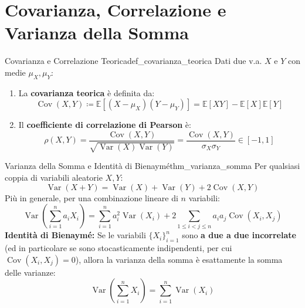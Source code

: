 \section{Covarianza, Correlazione e Varianza della Somma}
\label{sec:covarianza_teorica}

\begin{definizione}{Covarianza e Correlazione Teorica}{def_covarianza_teorica}
Dati due v.a. $X$ e $Y$ con medie $\mu_X, \mu_Y$:
\begin{enumerate}
    \item La \textbf{covarianza teorica} è definita da:
    \begin{equation}
        \operatorname{Cov}(X, Y) \coloneqq \mathbb{E}[(X - \mu_X)(Y - \mu_Y)] = \mathbb{E}[XY] - \mathbb{E}[X]\mathbb{E}[Y]
    \end{equation}
    \item Il \textbf{coefficiente di correlazione di Pearson} è:
    \begin{equation}
        \rho(X, Y) = \frac{\operatorname{Cov}(X, Y)}{\sqrt{\operatorname{Var}(X)\operatorname{Var}(Y)}} = \frac{\operatorname{Cov}(X, Y)}{\sigma_X \sigma_Y} \in [-1, 1]
    \end{equation}
\end{enumerate}
\end{definizione}

\begin{teorema}{Varianza della Somma e Identità di Bienaymé}{thm_varianza_somma}
Per qualsiasi coppia di variabili aleatorie $X, Y$:
\begin{equation}
    \operatorname{Var}(X + Y) = \operatorname{Var}(X) + \operatorname{Var}(Y) + 2\operatorname{Cov}(X, Y)
\end{equation}
Più in generale, per una combinazione lineare di $n$ variabili:
\begin{equation}
    \operatorname{Var}\left(\sum_{i=1}^n a_i X_i\right) = \sum_{i=1}^n a_i^2 \operatorname{Var}(X_i) + 2 \sum_{1 \le i < j \le n} a_i a_j \operatorname{Cov}(X_i, X_j)
\end{equation}
\textbf{Identità di Bienaymé:} Se le variabili $\{X_i\}_{i=1}^n$ sono \textbf{a due a due incorrelate} (ed in particolare se sono stocasticamente indipendenti, per cui $\operatorname{Cov}(X_i, X_j) = 0$), allora la varianza della somma è esattamente la somma delle varianze:
\begin{equation}
    \operatorname{Var}\left(\sum_{i=1}^n X_i\right) = \sum_{i=1}^n \operatorname{Var}(X_i)
\end{equation}
\end{teorema}

